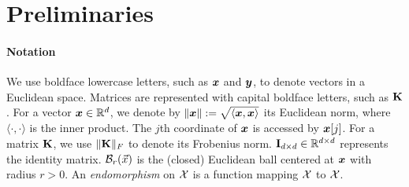 \section{Preliminaries}
\label{sec:prel}

\paragraph{Notation} We use boldface lowercase letters, such as ${\bm{x}}$ and ${\bm{y}}$, to denote vectors in a Euclidean space. Matrices are represented with capital boldface letters, such as ${\mathbf{K}}$. For a vector ${\bm{x}} \in \mathbb R^d$, we denote by $\|{\bm{x}} \| := \sqrt{\langle {\bm{x}}, {\bm{x}} \rangle}$ its Euclidean norm, where $\langle \cdot, \cdot \rangle$ is the inner product. The $j$th coordinate of ${\bm{x}}$ is accessed by ${\bm{x}}[j]$. For a matrix ${\mathbf{K}}$, we use $\|{\mathbf{K}}\|_F$ to denote its Frobenius norm. ${\mathbf{I}}_{d \times d} \in \mathbb R^{d \times d}$ represents the identity matrix. ${\mathcal{B}}_r(\vec{x})$ is the (closed) Euclidean ball centered at ${\bm{x}}$ with radius $r > 0$. An \emph{endomorphism} on ${\mathcal{X}}$ is a function mapping ${\mathcal{X}}$ to ${\mathcal{X}}$.

